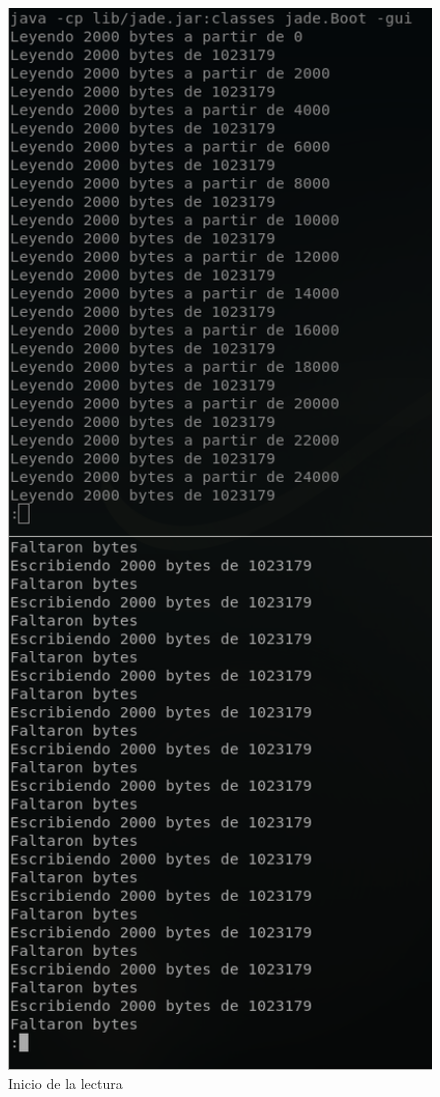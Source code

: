 \documentclass[12pt,journal,compsoc]{IEEEtran}
\begin{document}
\begin{figure}[H]
  \centering
  \includegraphics[width=160mm]{images/punto-3/readwrite/2-start-read.png}
  \caption{Inicio de la lectura}
  \label{fig:start-read2}
\end{figure}
\end{document}
